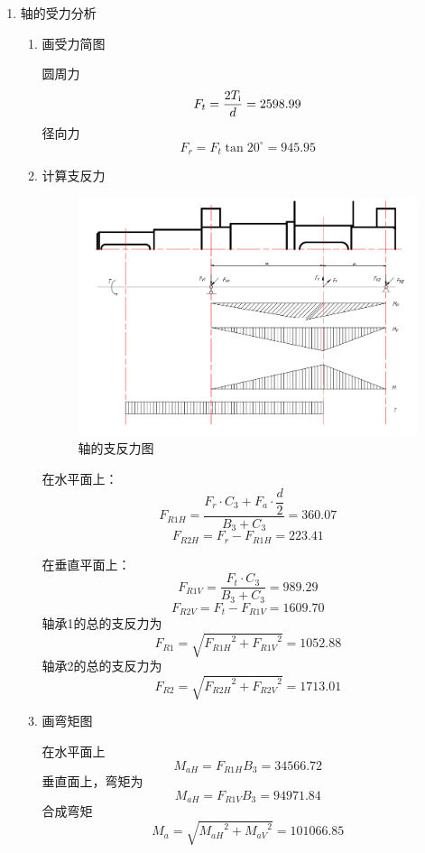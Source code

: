 \begin{enumerate}[A]
	\item 轴的受力分析
	\begin{enumerate}[a]
		\item 画受力简图
		\par 圆周力 $$F_t=\frac{2T_{\mathrm{{\uppercase\expandafter{\romannumeral1}}}}}{d}=2598.99$$
		径向力 $$F_r=F_t\tan{20^{\circ}}=945.95$$
		\item 计算支反力 
		\begin{figure}[H]
			\begin{center}
				\includegraphics[width=\textwidth]{pic/jiaohe3.png}
				\caption{轴\uppercase\expandafter{}的支反力图}
			\end{center}
		\end{figure}
		\par 在水平面上：
		$$F_{R1H}=\dfrac{F_r\cdot C_3+F_a\cdot \dfrac{d}{2}}{B_3+C_3}=360.07$$
		$$F_{R2H}=F_r-F_{R1H}=223.41$$
		\par 在垂直平面上：
		$$F_{R1V}=\dfrac{F_t\cdot C_3}{B_3+C_3}=989.29$$
		$$F_{R2V}=F_t-F_{R1V}=1609.70$$
		轴承1的总的支反力为
		$$F_{R1}=\sqrt{{F_{R1H}}^2+{F_{R1V}}^2}=1052.88$$
		轴承2的总的支反力为
		$$F_{R2}=\sqrt{{F_{R2H}}^2+{F_{R2V}}^2}=1713.01$$
		\item 画弯矩图
		\par 在水平面上 
		$$M_{aH}=F_{R1H}B_3=34566.72$$
		垂直面上，弯矩为\\
		$$M_{aH}=F_{R1V}B_3=94971.84$$
		合成弯矩
		$$M_a=\sqrt{{M_{aH}}^2+{M_{aV}}^2}=101066.85$$
		

\end{enumerate}
\end{enumerate}
